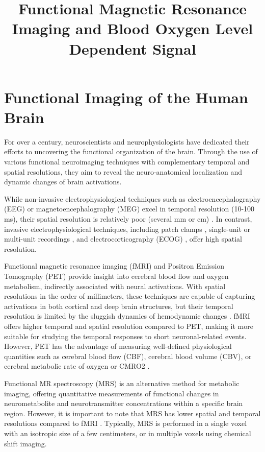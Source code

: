 \title{Functional Magnetic Resonance Imaging and Blood Oxygen Level Dependent Signal}
\label{cha:intro}

\section{Functional Imaging of the Human Brain}

For over a century, neuroscientists and neurophysiologists have dedicated their
efforts to uncovering the functional organization of the brain. Through the use
of various functional neuroimaging techniques with complementary temporal and
spatial resolutions, they aim to reveal the neuro-anatomical localization and
dynamic changes of brain activations.

While non-invasive electrophysiological techniques such as
electroencephalography (EEG) or magnetoencephalography (MEG) excel in temporal
resolution (10-100 ms), their spatial resolution is relatively poor (several mm
or cm)
\citep{Baillet2001Electromagneticbrainmapping,Haemaelaeinen1993Magnetoencephalographytheoryinstrumentationapplications}.
In contrast, invasive electrophysiological techniques, including patch clamps
\citep{Neher1978extracellularpatchclamp}, single-unit or multi-unit recordings
\citep{Arieli1995Coherentspatiotemporalpatterns}, and electrocorticography
(ECOG)
\citep{Miller2007Realtimefunctional,Nir2008Interhemisphericcorrelationsslow},
offer high spatial resolution.

Functional magnetic resonance imaging (fMRI) and Positron Emission Tomography
(PET) provide insight into cerebral blood flow and oxygen metabolism, indirectly
associated with neural activations. With spatial resolutions in the order of
millimeters, these techniques are capable of capturing activations in both
cortical and deep brain structures, but their temporal resolution is limited by
the sluggish dynamics of hemodynamic changes
\citep{Dale2001Spatiotemporalmappingbrain}. fMRI offers higher temporal and
spatial resolution compared to PET, making it more suitable for
studying the temporal responses to short neuronal-related events. However, PET
has the advantage of measuring well-defined physiological quantities such as
cerebral blood flow (CBF), cerebral blood volume (CBV), or cerebral metabolic
rate of oxygen or CMRO2
\citep{Fox1986Mappinghumanvisual,Friston1993FunctionalConnectivityPrincipal}.

Functional MR spectroscopy (MRS) is an alternative method for metabolic imaging,
offering quantitative measurements of functional changes in neurometabolite and
neurotransmitter concentrations within a specific brain region. However, it is
important to note that MRS has lower spatial and temporal resolutions compared
to fMRI \citep{Morris1999Magneticresonanceimaging}. Typically, MRS is performed
in a single voxel with an isotropic size of a few centimeters, or in multiple
voxels using chemical shift imaging.

